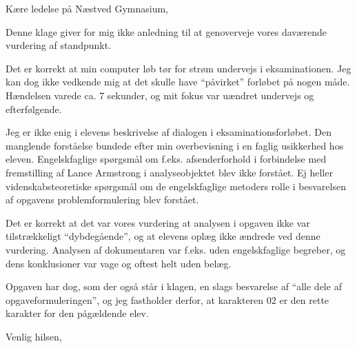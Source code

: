 \documentclass[11pt,a4paper]{letter}
\date{\vest\today}
\newcommand{\qm}[1]{“#1”}
\let\letterclassopening\opening
\renewcommand{\opening}[1]{\letterclassopening{#1}\vspace{2em}}
\renewcommand{\closing}[1]{\par\vspace{2em}\noindent #1\par\vspace{1em}\noindent\fromsig\par}
\begin{document}
\begin{letter}{}
\opening{Kære ledelse på Næstved Gymnasium,}

Denne klage giver for mig ikke anledning til at genoverveje vores daværende vurdering af standpunkt.

Det er korrekt at min computer løb tør for strøm undervejs i eksaminationen. Jeg kan dog ikke vedkende mig at det skulle have \qm{påvirket} forløbet på nogen måde. Hændelsen varede ca. 7 sekunder, og mit fokus var uændret undervejs og efterfølgende.

Jeg er ikke enig i elevens beskrivelse af dialogen i eksaminationsforløbet. Den manglende forståelse bundede efter min overbevisning i en faglig usikkerhed hos eleven. Engelskfaglige spørgsmål om f.eks. afsenderforhold i forbindelse med fremstilling af Lance Armstrong i analyseobjektet blev ikke forstået. Ej heller videnskabsteoretiske spørgsmål om de engelskfaglige metoders rolle i besvarelsen af opgavens problemformulering blev forstået.

Det er korrekt at det var vores vurdering at analysen i opgaven ikke var tilstrækkeligt \qm{dybdegående}, og at elevens oplæg ikke ændrede ved denne vurdering. Analysen af dokumentaren var f.eks. uden engelskfaglige begreber, og dens konklusioner var vage og oftest helt uden belæg. 

Opgaven har dog, som der også står i klagen, en slags besvarelse af \qm{alle dele af opgaveformuleringen}, og jeg fastholder derfor, at karakteren 02 er den rette karakter for den pågældende elev.

\closing{Venlig hilsen,}

\end{letter}
\end{document}
